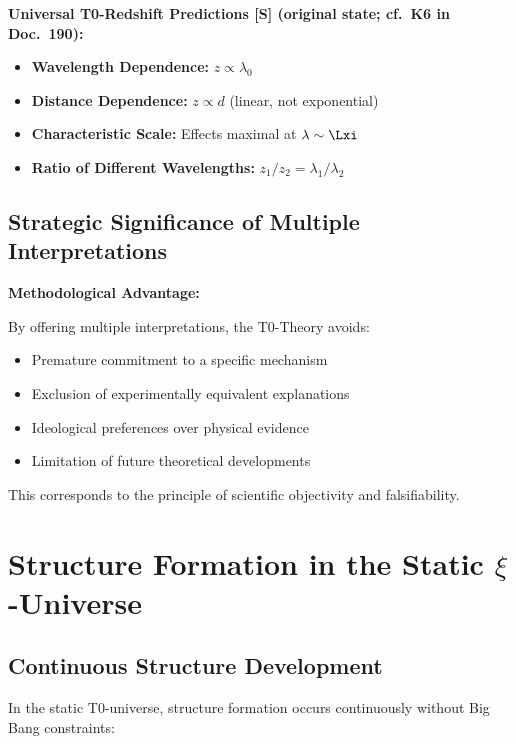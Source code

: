 	\begin{keyresult}
		\textbf{Universal T0-Redshift Predictions [S] (original state; cf.\ K6 in Doc.~190):}
		
		\begin{itemize}
			\item \textbf{Wavelength Dependence:} $z \propto \lambda_0$
			\item \textbf{Distance Dependence:} $z \propto d$ (linear, not exponential)
			\item \textbf{Characteristic Scale:} Effects maximal at $\lambda \sim \Lxi$
			\item \textbf{Ratio of Different Wavelengths:} $z_1/z_2 = \lambda_1/\lambda_2$
		\end{itemize}
	\end{keyresult}
	
	\subsection{Strategic Significance of Multiple Interpretations}
	
	\begin{warning}
		\textbf{Methodological Advantage:}
		
		By offering multiple interpretations, the T0-Theory avoids:
		\begin{itemize}
			\item Premature commitment to a specific mechanism
			\item Exclusion of experimentally equivalent explanations
			\item Ideological preferences over physical evidence
			\item Limitation of future theoretical developments
		\end{itemize}
		
		This corresponds to the principle of scientific objectivity and falsifiability.
	\end{warning}	
	\section{Structure Formation in the Static $\xi$-Universe}
	
	\subsection{Continuous Structure Development}
	
	In the static T0-universe, structure formation occurs continuously without Big Bang constraints:
	
